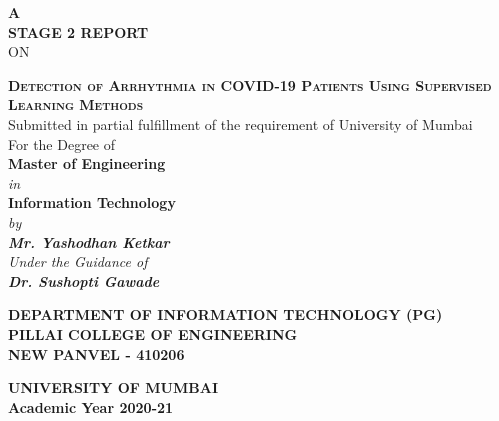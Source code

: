 \begin{titlepage}
  \thispagestyle{empty}

  {\centering
    {\Large\bf
      A\\
      \vspace{0.5cm}
      STAGE 2 REPORT}\\
    \vspace{0.5cm}
    {ON}
    \\
  }

  \vspace{0.4cm}
  {\centering
  \large
  {\LARGE\bf \scshape{Detection of Arrhythmia in COVID-19 Patients Using Supervised Learning Methods}}\\
  \vspace{1cm}
  {Submitted in partial fulfillment of the requirement of University of Mumbai} \\
  {For the Degree of } \\
  \vspace{0.2cm}
  {\bf Master of Engineering } \\
  {\it{in}} \\
  {\bf Information Technology } \\
  \vspace{0.6cm}
  \it{by} \\
  \vspace{.2cm}
  \rm
  {\large \bf {Mr. Yashodhan Ketkar}}\\

  \vspace{0.8cm}
  {\it{Under the Guidance of}} \\
  \vspace{.2cm}
  \hspace{.05cm} {\large \textbf {Dr. Sushopti Gawade}}\\
  \vspace {1cm}

  \begin{figure}[h!]
    {\par}
  \end{figure}
  \vspace{0.2cm}

  {\bf
    DEPARTMENT OF INFORMATION TECHNOLOGY (PG) \\
    \vspace{0.2cm}
    \bf {PILLAI COLLEGE OF ENGINEERING}\\
    \bf NEW PANVEL - 410206
  } \\
  {\centering
  \hspace{.5cm}


  {\centering
    {\bf UNIVERSITY OF MUMBAI} \\
    \vspace{0.2cm}
  }
  {\centering
    {\bf Academic Year 2020-21}}
  }
  \\
  }
\end{titlepage}
